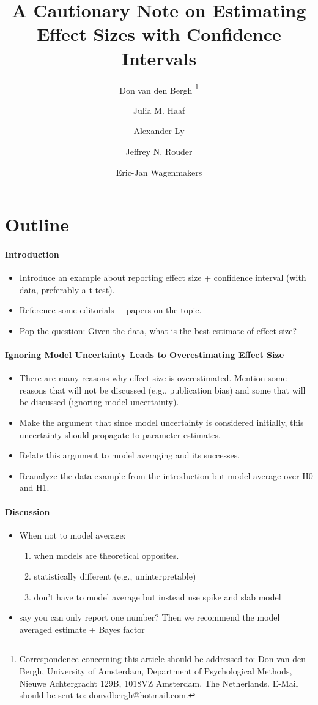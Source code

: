 \documentclass[a4paper]{article}
\title{A Cautionary Note on Estimating Effect Sizes with Confidence Intervals}
\author[1]{Don van den Bergh%
	\thanks{Correspondence concerning this article should be addressed to: Don van den Bergh, University of Amsterdam, Department of Psychological Methods, Nieuwe Achtergracht 129B, 1018VZ Amsterdam, The Netherlands. E-Mail should be sent to: donvdbergh@hotmail.com.
}}
\author[1]{Julia M. Haaf}
\author[1,2]{Alexander Ly}
\author[3]{\authorcr Jeffrey N. Rouder} %
\author[1]{Eric-Jan Wagenmakers}
\affil[1]{University of Amsterdam}
\affil[2]{Centrum Wiskunde \& Informatica}
\affil[3]{University of California Irvine}
\date{}
\begin{document}
\tbEffectSizeExample
	\section*{Outline}

\paragraph{Introduction}
\begin{itemize}
	\item Introduce an example about reporting effect size + confidence interval (with data, preferably a t-test). 
	\item Reference some editorials + papers on the topic.
	\item Pop the question: Given the data, what is the best estimate of effect size?
\end{itemize}
\paragraph{Ignoring Model Uncertainty Leads to Overestimating Effect Size}
\begin{itemize}
	\item There are many reasons why effect size is overestimated. Mention some reasons that will not be discussed (e.g., publication bias) and some that will be discussed (ignoring model uncertainty).
	\item Make the argument that since model uncertainty is considered initially, this uncertainty should propagate to parameter estimates.
	\item Relate this argument to model averaging and its successes.
	\item Reanalyze the data example from the introduction but model average over H0 and H1.
\end{itemize}
\paragraph{Discussion}
\begin{itemize}
	\item When not to model average:
	\begin{enumerate}
		\item when models are theoretical opposites.
		\item statistically different (e.g., uninterpretable)
		\item don't have to model average but instead use spike and slab model
	\end{enumerate}
	\item say you can only report one number? Then we recommend the model averaged estimate + Bayes factor
\end{itemize}
\end{document}
